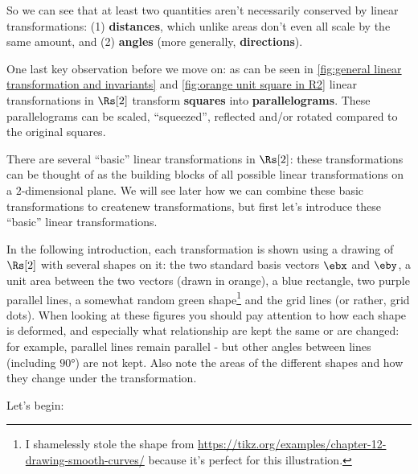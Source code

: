 So we can see that at least two quantities aren't necessarily conserved by linear transformations: (1) \textbf{distances}, which unlike areas don't even all scale by the same amount, and (2) \textbf{angles} (more generally, \textbf{directions}).

One last key observation before we move on: as can be seen in \autoref{fig:general linear transformation and invariants} and \autoref{fig:orange unit square in R2} linear transfornations in $\Rs[2]$ transform \textbf{squares} into \textbf{parallelograms}. These parallelograms can be scaled, \enquote{squeezed}, reflected and/or rotated compared to the original squares.

There are several \enquote{basic} linear transformations in $\Rs[2]$: these transformations can be thought of as the building blocks of all possible linear transformations on a $2$-dimensional plane. We will see later how we can combine these basic transformations to createnew transformations, but first let's introduce these \enquote{basic} linear transformations.

In the following introduction, each transformation is shown using a drawing of $\Rs[2]$ with several shapes on it: the two standard basis vectors $\ebx$ and $\eby$, a unit area between the two vectors (drawn in orange), a blue rectangle, two purple parallel lines, a somewhat random green shape\footnote{I shamelessly stole the shape from \url{https://tikz.org/examples/chapter-12-drawing-smooth-curves/} because it's perfect for this illustration.} and the grid lines (or rather, grid dots). When looking at these figures you should pay attention to how each shape is deformed, and especially what relationship are kept the same or are changed: for example, parallel lines remain parallel - but other angles between lines (including $\ang{90}$) are not kept. Also note the areas of the different shapes and how they change under the transformation.

Let's begin:

